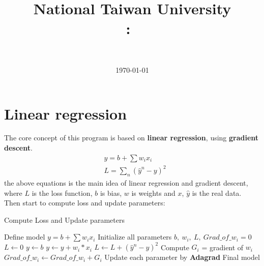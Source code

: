 \documentclass[11pt]{article}
\title{
{National Taiwan University}\\    
    \textmd{\textbf{\Class:\ \Title}}
}
\author{
	\Department \ \AuthorID \\
	\textbf{\AuthorName}
}
\date{
	\today \\
	\horline{1pt}
}
\newcommand\n{\mbox{\qquad}}
\begin{document}
\maketitle

\section{Linear regression}
\n The core concept of this program is based on \textbf{linear regression}, using \textbf{gradient descent}.
\begin{align*}
	&y = b + \sum w_i x_i \\
	&L = \sum_n (\widehat{y}^n - y)^2 
\end{align*}
the above equations is the main idea of linear regression and gradient descent, where $L$ is the loss function, $b$ is bias, $w$ is weights and $x$, $\widehat{y}$ is the real data.
\\ \n Then start to compute loss and update parameters:
\begin{algorithm}[h]
	\caption{Compute Loss and Update parameters}\label{euclid}
	\begin{algorithmic}[1]
		\State Define model $y =  b + \sum w_i x_i $
		\State Initialize all parameters $b,\ w_i,\ L,\ Grad\_of\_w_i = 0$ 		
			\State $L \leftarrow 0$	
				\State $y \leftarrow b$				
					\State $y \leftarrow y + w_i * x_i$	
				\EndFor
				\State $L \leftarrow L + (\widehat{y}^n - y)^2 $
					\State Compute $G_i$ = gradient of $w_i$
					\State $Grad\_of\_w_i \leftarrow Grad\_of\_w_i + G_i$				
				\EndFor			
			\EndFor
			\State Update each parameter by \textbf{Adagrad}
		\EndFor
		\State \Return Final model
	\end{algorithmic}
\end{algorithm}
\end{document}
